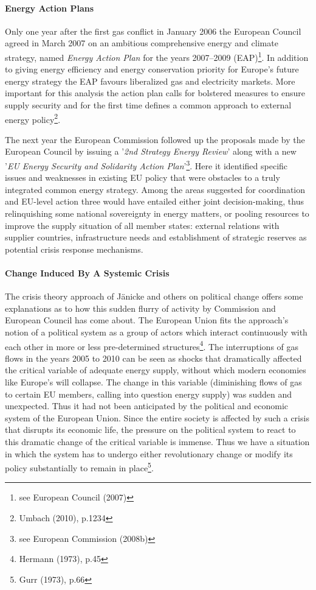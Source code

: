 \documentclass[11pt,a4paper,english]{scrreprt}
\begin{document}
      \paragraph{Energy Action Plans}

Only one year after the first gas conflict in January 2006 the European
Council agreed in March 2007 on an ambitious comprehensive energy and climate
strategy, named \emph{Energy Action Plan}  for the years 2007--2009
(EAP)\footnote{see European Council (2007)}. In addition to giving energy
efficiency and energy conservation priority for Europe's future energy strategy
the EAP favours liberalized gas and electricity markets. More important for this
analysis the action plan calls for bolstered measures to ensure supply security
and for the first time defines a common approach to external energy
policy\footnote{Umbach (2010), p.1234}.\par


The next year the European Commission followed up the proposals made by the
European Council by issuing a '\emph{2nd Strategy Energy Review}' along with a
new '\emph{EU Energy Security and Solidarity Action Plan}'\footnote{see European
Commission (2008b)}. Here it identified specific issues and weaknesses in
existing EU policy that were obstacles to a truly integrated common energy
strategy. Among the areas suggested for coordination and EU-level action three
would have entailed either joint decision-making, thus relinquishing some
national sovereignty in energy matters, or pooling resources to improve the
supply situation of all member states: external relations with supplier
countries, infrastructure needs and establishment of strategic reserves as
potential crisis response mechanisms.\par


	\paragraph{Change Induced By A Systemic Crisis}

The crisis theory approach of J\"anicke and others on political change offers
some explanations as to how this sudden flurry of activity by Commission and
European Council has come about. The European Union fits the approach's notion
of a political system as a group of actors which interact continuously with
each other in more or less pre-determined structures\footnote{Hermann (1973),
p.45}. The interruptions of gas flows in the years 2005 to 2010 can be seen as
shocks that dramatically affected the critical variable of adequate energy
supply, without which modern economies like Europe's will collapse. The change
in this variable (diminishing flows of gas to certain EU members, calling into
question energy supply) was sudden and unexpected. Thus it had not been
anticipated by the political and economic system of the European Union. Since
the entire society is affected by such a crisis that disrupts its economic life,
the pressure on the political system to react to this dramatic change of the
critical variable is immense. Thus we have a situation in which the system has
to undergo either revolutionary change or modify its policy substantially to
remain in place\footnote{Gurr (1973), p.66}.\par
\end{document}
